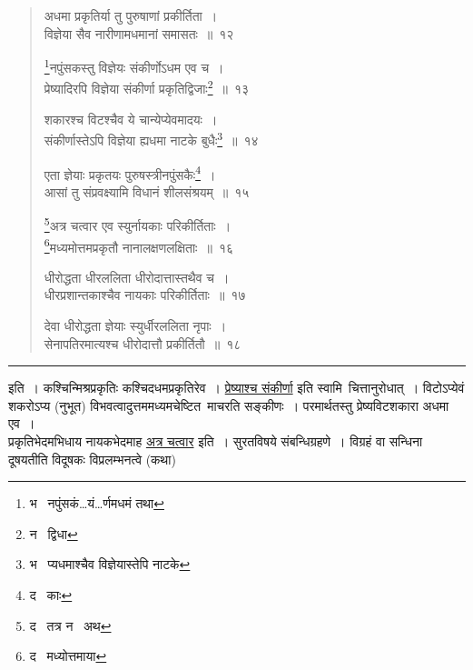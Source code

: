 \documentclass[11pt, openany]{book}
\begin{document}
\begin{quote}
{\na अधमा प्रकृतिर्या तु पुरुषाणां प्रकीर्तिता~।\\
विज्ञेया सैव नारीणामधमानां समासतः~॥~१२

\renewcommand{\thefootnote}{1}\footnote{भ \textendash\  नपुंसकं\ldots यं\ldots र्णमधमं तथा}नपुंसकस्तु विज्ञेयः संकीर्णोऽधम एव च~।\\
प्रेष्यादिरपि विज्ञेया संकीर्णा प्रकृतिद्विजाः\renewcommand{\thefootnote}{2}\footnote{न \textendash\  द्विधा}~॥~१३

शकारश्च विटश्चैव ये चान्येप्येवमादयः~।\\
संकीर्णास्तेऽपि विज्ञेया ह्यधमा नाटके बुधैः\renewcommand{\thefootnote}{3}\footnote{भ \textendash\  प्यधमाश्चैव विज्ञेयास्तेपि नाटके}~॥~१४

एता ज्ञेयाः प्रकृतयः पुरुषस्त्रीनपुंसकैः\renewcommand{\thefootnote}{4}\footnote{द \textendash\  काः}~।\\
आसां तु संप्रवक्ष्यामि विधानं शीलसंश्रयम्~॥~१५

\renewcommand{\thefootnote}{5}\footnote{द \textendash\  तत्र न \textendash\  अथ}अत्र चत्वार एव स्युर्नायकाः परिकीर्तिताः~।\\
\renewcommand{\thefootnote}{6}\footnote{द \textendash\  मध्योत्तमाया}मध्यमोत्तमप्रकृतौ नानालक्षणलक्षिताः~॥~१६

धीरोद्धता धीरललिता धीरोदात्तास्तथैव च~।\\
धीरप्रशान्तकाश्चैव नायकाः परिकीर्तिताः~॥~१७

देवा धीरोद्धता ज्ञेयाः स्युर्धीरललिता नृपाः~।\\
सेनापतिरमात्यश्च धीरोदात्तौ प्रकीर्तितौ~॥~१८}
\end{quote}

\hrule

\vspace{2mm}
\noindent
इति~। कश्चिन्मिश्रप्रकृतिः कश्चिदधमप्रकृतिरेव~। \underline{प्रेष्याश्च संकीर्णा} इति स्वामि\textendash\ चित्तानुरोधात्~। विटोऽप्येवं शकरोऽप्य (नुभूत) विभवत्वादुत्तममध्यमचेष्टित\textendash\ माचरति सङ्कीणः~। परमार्थतस्तु प्रेष्यविटशकारा अधमा एव~।\\

प्रकृतिभेदमभिधाय नायकभेदमाह \underline{अत्र चत्वार} इति~। सुरतविषये संबन्धिग्रहणे~। विग्रहं वा सन्धिना दूषयतीति विदूषकः विप्रलम्भनत्वे (कथा)

\newpage
\end{document}
